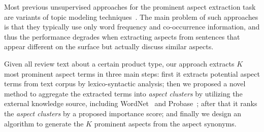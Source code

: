 Most previous unsupervised approaches for the prominent 
aspect extraction task are variants of topic modeling 
techniques~\cite{lakkaraju2011exploiting,lin2009joint,wang2011latent}.
The main problem of such approaches 
is that they typically use only word frequency and co-occurrence information, 
and thus the performance degrades when extracting aspects from 
sentences that appear
different on the surface but actually discuss similar aspects. 

Given all review text about a certain product type,
our approach
extracts $K$ most prominent aspect terms in three main steps: 
first it extracts potential aspect terms from text corpus by lexico-syntactic analysis; 
then we proposed a novel method to aggregate the extracted terms 
into \emph{aspect clusters} by utilizing the external knowledge source,
including WordNet~\cite{miller1995wordnet} and Probase~\cite{wu2012probase}; 
after that it ranks the \emph{aspect clusters} by a proposed importance score; 
and finally we design an algorithm to generate the $K$ prominent
aspects from the aspect synonyms.

  
